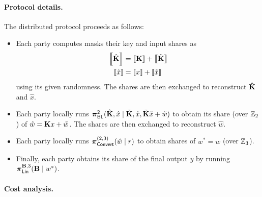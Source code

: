 \paragraph{Protocol details.}
The distributed protocol proceeds as follows:
\begin{itemize}
    \item Each party computes masks their key and input shares as 
    \begin{align*}
    \share{\hat{\mat{K}}} &= \share{\mat{K}} + \share{\tilde{\mat{K}}} \\
    \share{\hat{x}} &= \share{x} + \share{\tilde{x}}
    \end{align*}
    using its given randomness. The shares are then exchanged to reconstruct $\mat{\hat{K}}$ and $\hat{x}$.

    \item Each party locally runs $\prot_\BLMap^2(\hat{\mat{K}}, \hat{x} \mid \tilde{\mat{K}}, \tilde{x}, \tilde{\mat{K}}\tilde{x} + \tilde{w})$ to obtain its share (over $\mathbb{Z}_2$) of $\hat{w} = \mat{K}x + \tilde{w}$. The shares are then exchanged to reconstruct $\hat{w}$.

    \item Each party locally runs $\boldsymbol{\pi}_{\textsf{Convert}}^{(2,3)}(\hat{w} \mid r)$ to obtain shares of $w^* = w$ (over $\mathbb{Z}_3$).

    \item Finally, each party obtains its share of the final output $y$ by running $\prot_\LMap^{\mat{B}, 3}(\mat{B} \mid w^*)$.
\end{itemize}



\paragraph{Cost analysis.}








